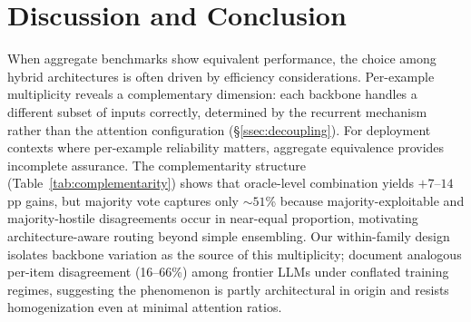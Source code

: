 \section{Discussion and Conclusion}\label{sec:discussion}

When aggregate benchmarks show equivalent performance, the choice among hybrid architectures is often driven by efficiency considerations. Per-example multiplicity reveals a complementary dimension: each backbone handles a different subset of inputs correctly, determined by the recurrent mechanism rather than the attention configuration (\S\ref{ssec:decoupling}). For deployment contexts where per-example reliability matters, aggregate equivalence provides incomplete assurance. The complementarity structure (Table~\ref{tab:complementarity}) shows that oracle-level combination yields $+7$--$14$\,pp gains, but majority vote captures only ${\sim}51$\% because majority-exploitable and majority-hostile disagreements occur in near-equal proportion, motivating architecture-aware routing beyond simple ensembling. Our within-family design isolates backbone variation as the source of this multiplicity; \citet{yang2026benchmark} document analogous per-item disagreement (16--66\%) among frontier LLMs under conflated training regimes, suggesting the phenomenon is partly architectural in origin and resists homogenization even at minimal attention ratios.
